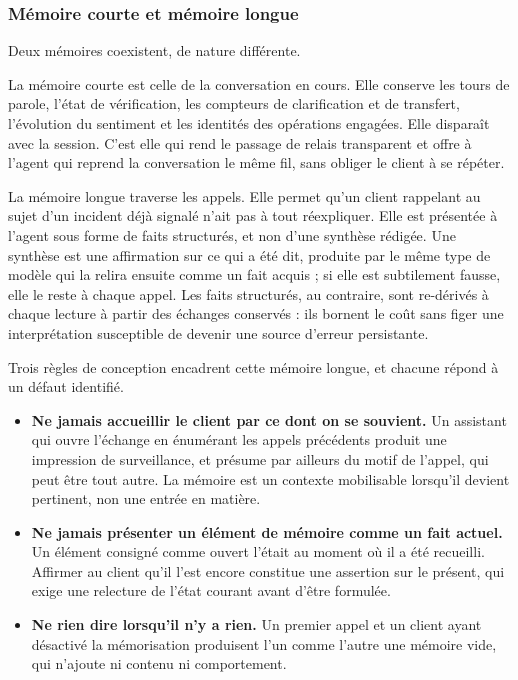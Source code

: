 \subsubsection{Mémoire courte et mémoire longue}

Deux mémoires coexistent, de nature différente.

La mémoire courte est celle de la conversation en cours. Elle conserve les tours de parole, l'état de vérification, les compteurs de clarification et de transfert, l'évolution du sentiment et les identités des opérations engagées. Elle disparaît avec la session. C'est elle qui rend le passage de relais transparent et offre à l'agent qui reprend la conversation le même fil, sans obliger le client à se répéter.

La mémoire longue traverse les appels. Elle permet qu'un client rappelant au sujet d'un incident déjà signalé n'ait pas à tout réexpliquer. Elle est présentée à l'agent sous forme de faits structurés, et non d'une synthèse rédigée. Une synthèse est une affirmation sur ce qui a été dit, produite par le même type de modèle qui la relira ensuite comme un fait acquis ; si elle est subtilement fausse, elle le reste à chaque appel. Les faits structurés, au contraire, sont re-dérivés à chaque lecture à partir des échanges conservés : ils bornent le coût sans figer une interprétation susceptible de devenir une source d'erreur persistante.

Trois règles de conception encadrent cette mémoire longue, et chacune répond à un défaut identifié.

\begin{itemize}
  \item \textbf{Ne jamais accueillir le client par ce dont on se souvient.} Un assistant qui ouvre l'échange en énumérant les appels précédents produit une impression de surveillance, et présume par ailleurs du motif de l'appel, qui peut être tout autre. La mémoire est un contexte mobilisable lorsqu'il devient pertinent, non une entrée en matière.
  \item \textbf{Ne jamais présenter un élément de mémoire comme un fait actuel.} Un élément consigné comme ouvert l'était au moment où il a été recueilli. Affirmer au client qu'il l'est encore constitue une assertion sur le présent, qui exige une relecture de l'état courant avant d'être formulée.
  \item \textbf{Ne rien dire lorsqu'il n'y a rien.} Un premier appel et un client ayant désactivé la mémorisation produisent l'un comme l'autre une mémoire vide, qui n'ajoute ni contenu ni comportement.
\end{itemize}

